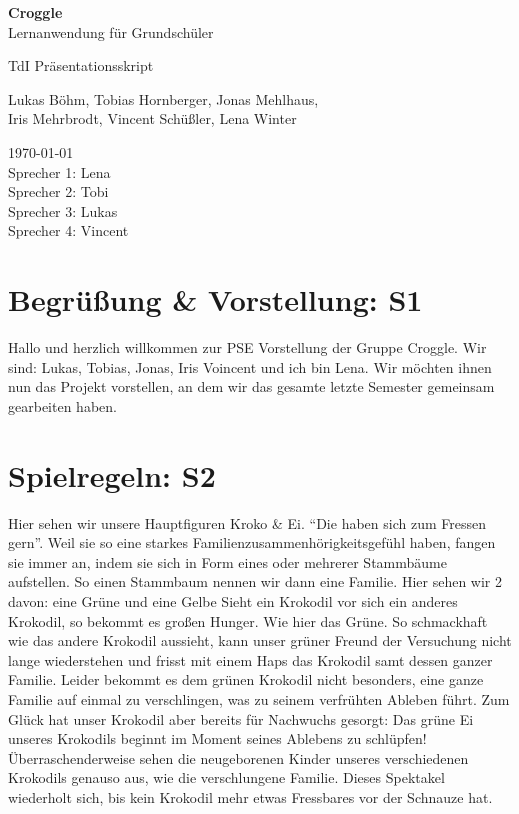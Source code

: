 \documentclass{scrartcl}
\begin{document}
	\begin{titlepage}
		\begin{center}
			{\huge \bfseries Croggle}\\[0.1cm]
			{\large  Lernanwendung für Grundschüler}
		\end{center}


		\begin{center}
			{\Large TdI Präsentationsskript}\\[0.5cm]
		\end{center}
		\begin{center}
			{Lukas Böhm, Tobias Hornberger, Jonas Mehlhaus, \\ Iris Mehrbrodt, Vincent Schüßler, Lena Winter} \\[1cm]
		\end{center}

		\begin{center}
			{\large \today \\
				Sprecher 1: Lena \\
				Sprecher 2:	Tobi \\
				Sprecher 3: Lukas \\
				Sprecher 4: Vincent
			}
		\end{center}
	\end{titlepage}

	\section{Begrüßung & Vorstellung: S1}
	Hallo und herzlich willkommen zur PSE Vorstellung der Gruppe Croggle.
	Wir sind: Lukas, Tobias, Jonas, Iris Voincent und ich bin Lena.
	Wir möchten ihnen nun das Projekt vorstellen, an dem wir das gesamte letzte Semester gemeinsam gearbeiten haben.
	 
	\section{Spielregeln: S2} 
	Hier sehen wir unsere Hauptfiguren Kroko \& Ei.
	"`Die haben sich zum Fressen gern"'.
	Weil sie so eine starkes Familienzusammenhörigkeitsgefühl haben, fangen sie immer an, indem sie sich in Form eines oder mehrerer Stammbäume aufstellen.
	So einen Stammbaum nennen wir dann eine Familie.
	Hier sehen wir 2 davon: eine Grüne und eine Gelbe	
	Sieht ein Krokodil vor sich ein anderes Krokodil, so bekommt es großen Hunger. Wie hier das Grüne. So schmackhaft wie das andere Krokodil aussieht, kann unser grüner Freund der Versuchung nicht lange wiederstehen und frisst mit einem Haps das Krokodil samt dessen ganzer Familie.
	Leider bekommt es dem grünen Krokodil nicht besonders, eine ganze Familie auf einmal zu verschlingen, was zu seinem verfrühten Ableben führt.
	Zum Glück hat unser Krokodil aber bereits für Nachwuchs gesorgt: Das grüne Ei unseres Krokodils beginnt im Moment seines Ablebens zu schlüpfen!
	Überraschenderweise sehen die neugeborenen Kinder unseres verschiedenen Krokodils genauso aus, wie die verschlungene Familie.
	Dieses Spektakel wiederholt sich, bis kein Krokodil mehr etwas Fressbares vor der Schnauze hat.
\end{document}
